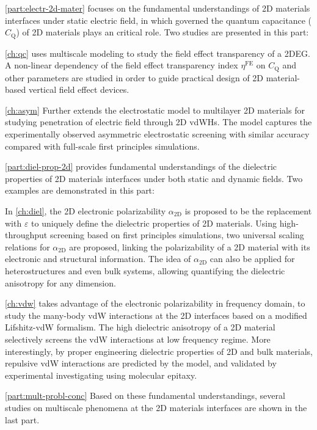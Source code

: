 \autoref{part:electr-2d-mater} focuses on the fundamental
understandings of 2D materials interfaces under static electric field,
in which governed the quantum capacitance ($C_{\mathrm{Q}}$) of 2D
materials plays an critical role.
%
Two studies are
presented in this part:
%

\autoref{ch:qc} uses multiscale modeling to study the field effect
transparency of a 2DEG. A non-linear dependency of the field effect
transparency index $\eta^{\mathrm{FE}}$ on $C_{\mathrm{Q}}$ and other parameters are
studied in order to guide practical design of 2D material-based
vertical field effect devices.
%

\autoref{ch:asym} Further extends the electrostatic model to
multilayer 2D materials for studying penetration of electric field
through 2D vdWHs. The model captures the experimentally observed
asymmetric electrostatic screening with similar accuracy compared with
full-scale first principles simulations.

\autoref{part:diel-prop-2d} provides fundamental understandings of the
dielectric properties of 2D materials interfaces under both static and
dynamic fields. Two examples are demonstrated in this part:
%

In \autoref{ch:diel}, the 2D electronic polarizability
$\alpha_{\mathrm{2D}}$ is proposed to be the replacement with
$\varepsilon$ to uniquely define the dielectric properties of 2D
materials. Using high-throughput screening based on first principles
simulations, two universal scaling relations for
$\alpha_{\mathrm{2D}}$ are proposed, linking the polarizability of a
2D material with its electronic and structural information.
%
The idea
of $\alpha_{\mathrm{2D}}$ can also be applied for heterostructures
and even bulk systems, allowing quantifying the dielectric anisotropy
for any dimension.
%

\autoref{ch:vdw} takes advantage of the electronic polarizability
in frequency domain, to study the many-body vdW interactions at the 2D
interfaces based on a modified Lifshitz-vdW
formalism. The high dielectric anisotropy of a 2D material selectively
screens the vdW interactions at low frequency regime. More
interestingly, by proper engineering dielectric properties of 2D and
bulk materials, repulsive vdW interactions are predicted by the model,
and validated by experimental investigating using molecular epitaxy.

\autoref{part:mult-probl-conc} Based on these fundamental understandings, several
studies on multiscale phenomena at the 2D materials interfaces are
shown in the last part.
%

